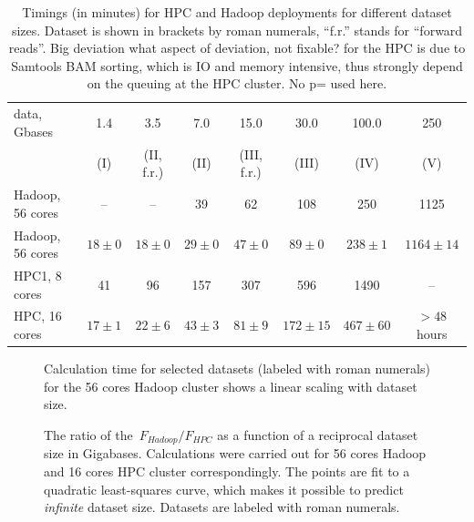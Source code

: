 \documentclass[11pt, oneside]{article}   	%
\newcommand{\COMMENT}[1]{{\color{red} #1 }}
\begin{document}
\begin{table}[tdp]
\small

\caption{Timings  (in minutes) for HPC and  Hadoop deployments for different dataset sizes.    Dataset is shown in brackets by roman numerals, ``f.r.'' stands for ``forward reads''. Big deviation \COMMENT{what aspect of deviation, not fixable?} for the HPC is due to Samtools BAM sorting, which is IO and memory intensive, thus strongly depend on the queuing at the HPC cluster. \COMMENT{No p= used here.} }
\begin{center}
\begin{tabular}{l|c|c|c|c|c|c|c}

data, Gbases		&	1.4	&	3.5		&	7.0		&	15.0		&	30.0		&	100.0	&	250 	\\
				&	(I)	&	(II, f.r.)	&	(II)		&	(III, f.r.)	&	(III)		&	(IV)		&	(V)\\
\hline
Hadoop, 56 cores&--&	--	&39		&62	&108	&250&1125\\
Hadoop, 56 cores		&	$18\pm0	$	&	$18\pm0	$	&	$29\pm0$	&	$47\pm0	$	&	$89\pm0$	&	$238\pm1$		&	$1164\pm14$\\
HPC1, 8 cores&	41&	96	&157	&307	&596	&1490&--\\
HPC, 16 cores	&	$17\pm1$	&	$22\pm6$	&	$43\pm3$	&	$81\pm9$	&	$172\pm15$		&	$467\pm60$	& $>48$ hours\\

\end{tabular}
\end{center}
\label{table:4}
\normalsize
\end{table}%

\begin{figure}[bt]
	
	\caption{Calculation time for selected datasets (labeled with roman numerals) for the 56 cores Hadoop cluster shows a linear scaling with dataset size. }
	\label{fig:fig1}
\end{figure}


\begin{figure}[bt]
	
	\caption{The ratio of the~$F_{Hadoop}/F_{HPC}$ as a function of a reciprocal dataset size in Gigabases. Calculations were carried out for 56 cores Hadoop and 16 cores HPC cluster correspondingly.
The points are fit to a quadratic least-squares curve, which makes it possible to predict {\it infinite} dataset size. Datasets are labeled with roman numerals.}
	\label{fig:fig2}
\end{figure}
\end{document}
